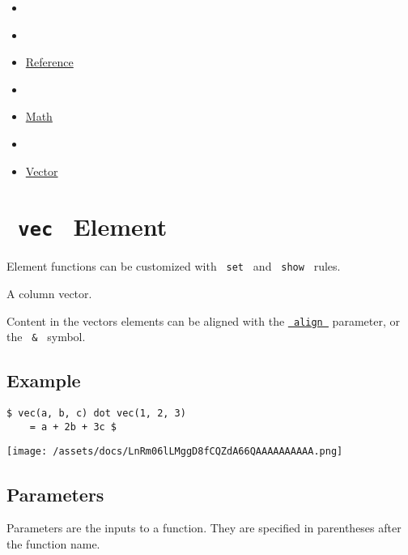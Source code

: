 \begin{itemize}
\tightlist
\item
  \href{/docs}{}
\item
  
\item
  \href{/docs/reference/}{Reference}
\item
  
\item
  \href{/docs/reference/math/}{Math}
\item
  
\item
  \href{/docs/reference/math/vec/}{Vector}
\end{itemize}

\section{\texorpdfstring{\texttt{\ vec\ } {{ Element
}}}{ vec   Element }}\label{summary}

\label{element-tooltip}
Element functions can be customized with \texttt{\ set\ } and
\texttt{\ show\ } rules.

A column vector.

Content in the vector\textquotesingle s elements can be aligned with the
\href{/docs/reference/math/vec/\#parameters-align}{\texttt{\ align\ }}
parameter, or the \texttt{\ \&\ } symbol.

\subsection{Example}\label{example}

\begin{verbatim}
$ vec(a, b, c) dot vec(1, 2, 3)
    = a + 2b + 3c $
\end{verbatim}

\texttt{[image: /assets/docs/LnRm06lLMggD8fCQZdA66QAAAAAAAAAA.png]}

\subsection{\texorpdfstring{{ Parameters
}}{ Parameters }}\label{parameters}

\label{parameters-tooltip}
Parameters are the inputs to a function. They are specified in
parentheses after the function name.

